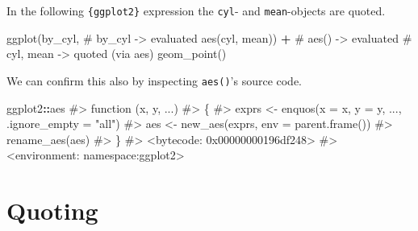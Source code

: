 \documentclass[
]{krantz}
\makeatletter
\newenvironment{Shaded}{\begin{snugshade}}{\end{snugshade}}
\newcommand{\CommentTok}[1]{\textcolor[rgb]{0.56,0.35,0.01}{\textit{#1}}}
\newcommand{\KeywordTok}[1]{\textcolor[rgb]{0.13,0.29,0.53}{\textbf{#1}}}
\newcommand{\NormalTok}[1]{#1}
\newcommand{\OperatorTok}[1]{\textcolor[rgb]{0.81,0.36,0.00}{\textbf{#1}}}
\newcommand{\StringTok}[1]{\textcolor[rgb]{0.31,0.60,0.02}{#1}}
\newenvironment{kframe}{%
\medskip{}
\setlength{\fboxsep}{.8em}
 \def\at@end@of@kframe{}%
 \ifinner\ifhmode%
  \def\at@end@of@kframe{\end{minipage}}%
  \begin{minipage}{\columnwidth}%
 \fi\fi%
 \def\FrameCommand##1{\hskip\@totalleftmargin \hskip-\fboxsep
 \colorbox{shadecolor}{##1}\hskip-\fboxsep
     \hskip-\linewidth \hskip-\@totalleftmargin \hskip\columnwidth}%
 \MakeFramed {\advance\hsize-\width
   \@totalleftmargin\z@ \linewidth\hsize
   \@setminipage}}%
 {\par\unskip\endMakeFramed%
 \at@end@of@kframe}
\renewenvironment{Shaded}{\begin{kframe}}{\end{kframe}}
\renewcommand{\KeywordTok} [1]{\textcolor[rgb]{0.00,0.44,0.13}{{#1}}}
\renewcommand{\StringTok}  [1]{\textcolor[rgb]{0.25,0.44,0.63}{{#1}}}
\renewcommand{\CommentTok} [1]{\textcolor[rgb]{0.38,0.63,0.69}{{#1}}}
\renewcommand{\NormalTok}  [1]{{#1}}
\makeatother
\begin{document}
\begin{Shaded}
\end{Shaded}

In the following \texttt{\{ggplot2\}} expression the \texttt{cyl}- and \texttt{mean}-objects are quoted.

\begin{Shaded}
\begin{Highlighting}[]
\KeywordTok{ggplot}\NormalTok{(by_cyl,            }\CommentTok{# by_cyl -> evaluated}
       \KeywordTok{aes}\NormalTok{(cyl, mean)) }\OperatorTok{+}\StringTok{  }\CommentTok{# aes() -> evaluated}
\StringTok{  }\CommentTok{# cyl, mean -> quoted (via aes)}
\StringTok{  }\KeywordTok{geom_point}\NormalTok{() }
\end{Highlighting}
\end{Shaded}

We can confirm this also by inspecting \texttt{aes()}'s source code.

\begin{Shaded}
\begin{Highlighting}[]
\NormalTok{ggplot2}\OperatorTok{::}\NormalTok{aes}
\CommentTok{#> function (x, y, ...) }
\CommentTok{#> \{}
\CommentTok{#>     exprs <- enquos(x = x, y = y, ..., .ignore_empty = "all")}
\CommentTok{#>     aes <- new_aes(exprs, env = parent.frame())}
\CommentTok{#>     rename_aes(aes)}
\CommentTok{#> \}}
\CommentTok{#> <bytecode: 0x00000000196df248>}
\CommentTok{#> <environment: namespace:ggplot2>}
\end{Highlighting}
\end{Shaded}

\hypertarget{quoting}{%
\section{Quoting}\label{quoting}}
\end{document}

